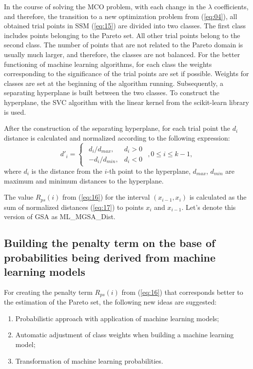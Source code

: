 \documentclass[runningheads]{llncs}
\begin{document}
In the course of solving the MCO problem, with each change in the $\lambda$ coefficients, and therefore, the transition to a new optimization problem from (\ref{eq:04}), all obtained trial points in SSM (\ref{eq:15}) are divided into two classes. The first class includes points belonging to the Pareto set. All other trial points belong to the second class. The number of points that are not related to the Pareto domain is usually much larger, and therefore, the classes are not balanced. For the better functioning of machine learning algorithms, for each class the weights corresponding to the significance of the trial points are set if possible. Weights for classes are set at the beginning of the algorithm running. Subsequently, a separating  hyperplane is built between the two classes. To construct the hyperplane, the SVC algorithm with the linear kernel from the scikit-learn library \cite{SVM_2000,PROB_2004} is used.

After the construction of the separating hyperplane, for each trial point the $d_i$ distance is calculated and normalized according to the following expression:
\begin{equation}
    \label{eq:17}
d'_i=
\begin{cases}
  \begin{matrix}
     d_i / d_{max}, & d_i > 0 \\
     -d_i / d_{min}, & d_i < 0 
  \end{matrix}
\end{cases}, 
0 \leq i \leq k-1,
\end{equation}
where $d_i$ is the distance from the $i$-th point to the hyperplane, $d_{max}$, $d_{min}$ are maximum and minimum distances to the hyperplane.

The value $R_{ps}(i)$ from (\ref{eq:16}) for the interval $(x_{i-1},x_{i})$ is calculated as the sum of normalized distances (\ref{eq:17}) to points $x_i$ and $x_{i-1}$. Let's denote this version of GSA as ML\_MGSA\_Dist.

\subsection{Building the penalty term on the base of probabilities being derived from machine learning models}
\label{ssec:42}

For creating the penalty term $R_{ps}(i)$ from (\ref{eq:16}) that corresponds better to the estimation of the Pareto set, the following new ideas are suggested: 
\begin{enumerate}
	\item Probabilistic approach with application of machine learning models;   
	\item Automatic adjustment of class weights when building a machine learning model;
	\item Transformation of machine learning probabilities.
\end{enumerate}
\end{document}
